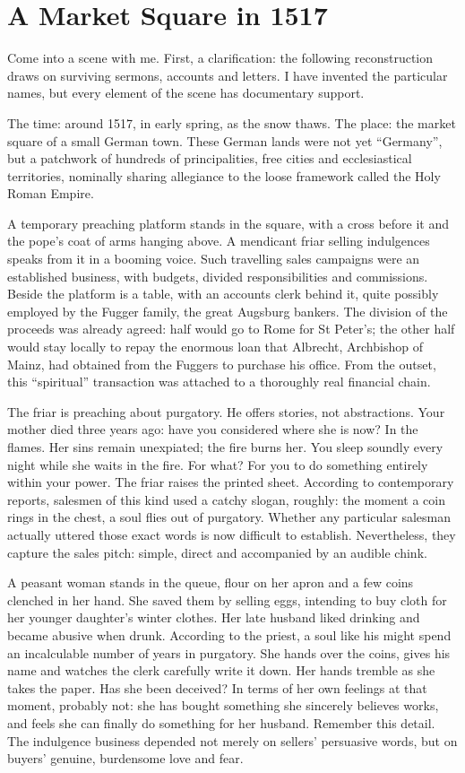 \section{A Market Square in 1517}
Come into a scene with me. First, a clarification: the following reconstruction draws on surviving sermons, accounts and letters. I have invented the particular names, but every element of the scene has documentary support.

The time: around 1517, in early spring, as the snow thaws. The place: the market square of a small German town. These German lands were not yet ``Germany'', but a patchwork of hundreds of principalities, free cities and ecclesiastical territories, nominally sharing allegiance to the loose framework called the Holy Roman Empire.

A temporary preaching platform stands in the square, with a cross before it and the pope's coat of arms hanging above. A mendicant friar selling indulgences speaks from it in a booming voice. Such travelling sales campaigns were an established business, with budgets, divided responsibilities and commissions. Beside the platform is a table, with an accounts clerk behind it, quite possibly employed by the Fugger family, the great Augsburg bankers. The division of the proceeds was already agreed: half would go to Rome for St Peter's; the other half would stay locally to repay the enormous loan that Albrecht, Archbishop of Mainz, had obtained from the Fuggers to purchase his office. From the outset, this ``spiritual'' transaction was attached to a thoroughly real financial chain.

The friar is preaching about purgatory. He offers stories, not abstractions. Your mother died three years ago: have you considered where she is now? In the flames. Her sins remain unexpiated; the fire burns her. You sleep soundly every night while she waits in the fire. For what? For you to do something entirely within your power. The friar raises the printed sheet. According to contemporary reports, salesmen of this kind used a catchy slogan, roughly: the moment a coin rings in the chest, a soul flies out of purgatory. Whether any particular salesman actually uttered those exact words is now difficult to establish. Nevertheless, they capture the sales pitch: simple, direct and accompanied by an audible chink.

A peasant woman stands in the queue, flour on her apron and a few coins clenched in her hand. She saved them by selling eggs, intending to buy cloth for her younger daughter's winter clothes. Her late husband liked drinking and became abusive when drunk. According to the priest, a soul like his might spend an incalculable number of years in purgatory. She hands over the coins, gives his name and watches the clerk carefully write it down. Her hands tremble as she takes the paper. Has she been deceived? In terms of her own feelings at that moment, probably not: she has bought something she sincerely believes works, and feels she can finally do something for her husband. Remember this detail. The indulgence business depended not merely on sellers' persuasive words, but on buyers' genuine, burdensome love and fear.

